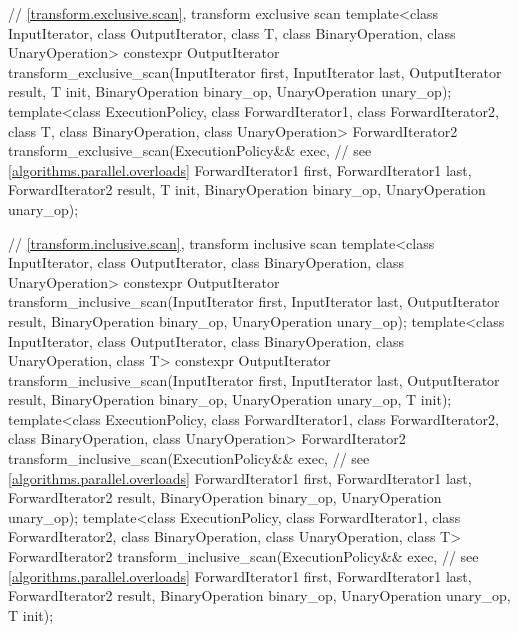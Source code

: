 \begin{codeblock}
{  // \ref{transform.exclusive.scan}, transform exclusive scan
  template<class InputIterator, class OutputIterator, class T,
           class BinaryOperation, class UnaryOperation>
    constexpr OutputIterator
      transform_exclusive_scan(InputIterator first, InputIterator last,
                               OutputIterator result, T init,
                               BinaryOperation binary_op, UnaryOperation unary_op);
  template<class ExecutionPolicy, class ForwardIterator1, class ForwardIterator2, class T,
           class BinaryOperation, class UnaryOperation>
    ForwardIterator2
      transform_exclusive_scan(ExecutionPolicy&& exec,          // see \ref{algorithms.parallel.overloads}
                               ForwardIterator1 first, ForwardIterator1 last,
                               ForwardIterator2 result, T init,
                               BinaryOperation binary_op, UnaryOperation unary_op);

  // \ref{transform.inclusive.scan}, transform inclusive scan
  template<class InputIterator, class OutputIterator,
           class BinaryOperation, class UnaryOperation>
    constexpr OutputIterator
      transform_inclusive_scan(InputIterator first, InputIterator last,
                               OutputIterator result,
                               BinaryOperation binary_op, UnaryOperation unary_op);
  template<class InputIterator, class OutputIterator,
           class BinaryOperation, class UnaryOperation, class T>
    constexpr OutputIterator
      transform_inclusive_scan(InputIterator first, InputIterator last,
                               OutputIterator result,
                               BinaryOperation binary_op, UnaryOperation unary_op, T init);
  template<class ExecutionPolicy, class ForwardIterator1, class ForwardIterator2,
           class BinaryOperation, class UnaryOperation>
    ForwardIterator2
      transform_inclusive_scan(ExecutionPolicy&& exec,          // see \ref{algorithms.parallel.overloads}
                               ForwardIterator1 first, ForwardIterator1 last,
                               ForwardIterator2 result, BinaryOperation binary_op,
                               UnaryOperation unary_op);
  template<class ExecutionPolicy, class ForwardIterator1, class ForwardIterator2,
           class BinaryOperation, class UnaryOperation, class T>
    ForwardIterator2
      transform_inclusive_scan(ExecutionPolicy&& exec,          // see \ref{algorithms.parallel.overloads}
                               ForwardIterator1 first, ForwardIterator1 last,
                               ForwardIterator2 result,
                               BinaryOperation binary_op, UnaryOperation unary_op, T init);

}
\end{codeblock}
